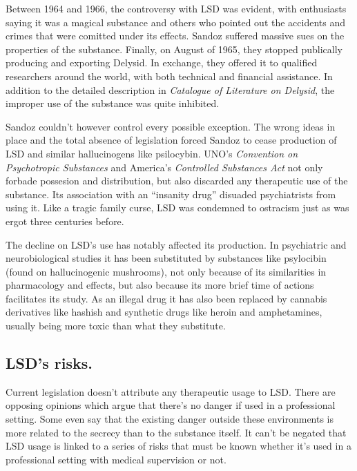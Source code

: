 Between 1964 and 1966, the controversy with LSD was evident, with enthusiasts saying it was a magical substance and others who pointed out the accidents and crimes that were comitted under its effects. Sandoz suffered massive sues on the properties of the substance. Finally, on August of 1965, they stopped publically producing and exporting Delysid. In exchange, they offered it to qualified researchers around the world, with both technical and financial assistance. In addition to the detailed description in \textit{Catalogue of Literature on Delysid}, the improper use of the substance was quite inhibited.

Sandoz couldn't however control every possible exception. The wrong ideas in place and the total absence of legislation forced Sandoz to cease production of LSD and similar hallucinogens like psilocybin. UNO's \textit{Convention on Psychotropic Substances} and America's \textit{Controlled Substances Act} not only forbade possesion and distribution, but also discarded any therapeutic use of the substance. Its association with an \enquote{insanity drug} disuaded psychiatrists from using it. Like a tragic family curse, LSD was condemned to ostracism just as was ergot three centuries before.

The decline on LSD's use has notably affected its production. In psychiatric and neurobiological studies it has been substituted by substances like psylocibin (found on hallucinogenic mushrooms), not only because of its similarities in pharmacology and effects, but also because its more brief time of actions facilitates its study. As an illegal drug it has also been replaced by cannabis derivatives like hashish and synthetic drugs like heroin and amphetamines, usually being more toxic than what they substitute.

\subsection{LSD's risks.}

Current legislation doesn't attribute any therapeutic usage to LSD. There are opposing opinions which argue that there's no danger if used in a professional setting. Some even say that the existing danger outside these environments is more related to the secrecy than to the substance itself. It can't be negated that LSD usage is linked to a series of risks that must be known whether it's used in a professional setting with medical supervision or not.

